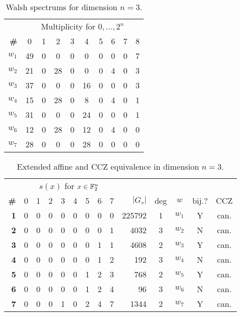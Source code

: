 \begin{table}[h]\centering
\begin{tabular}{>{\bfseries}rccccccccc}
\toprule
& \multicolumn{9}{c}{Multiplicity for $0, ..., 2^n$} \\
\cmidrule{2-10}
\# & 0 & 1 & 2 & 3 & 4 & 5 & 6 & 7 & 8 \\
\midrule
$w_1$ & 49 & 0 & 0 & 0 & 0 & 0 & 0 & 0 & 7 \\
$w_2$ & 21 & 0 & 28 & 0 & 0 & 0 & 4 & 0 & 3 \\
$w_3$ & 37 & 0 & 0 & 0 & 16 & 0 & 0 & 0 & 3 \\
$w_4$ & 15 & 0 & 28 & 0 & 8 & 0 & 4 & 0 & 1 \\
$w_5$ & 31 & 0 & 0 & 0 & 24 & 0 & 0 & 0 & 1 \\
$w_6$ & 12 & 0 & 28 & 0 & 12 & 0 & 4 & 0 & 0 \\
$w_7$ & 28 & 0 & 0 & 0 & 28 & 0 & 0 & 0 & 0 \\
\bottomrule
\end{tabular}
\caption{Walsh spectrums for dimension $n=3$.}
\label{tab:walshdim3}
\end{table}

\begin{table}[h]\centering
\begin{tabular}{>{\bfseries}rccccccccrcccc}
\toprule
& \multicolumn{8}{c}{$s(x)$ for $x\in{\mathbb{F}}_2^n$} \\
\cmidrule{2-9}
\# & 0 & 1 & 2 & 3 & 4 & 5 & 6 & 7 & $|G_s|$ & deg & $w$ & bij.? & CCZ \\
\midrule
1 & 0 & 0 & 0 & 0 & 0 & 0 & 0 & 0 & 225792 & 1 & $w_1$ & Y & can. \\
2 & 0 & 0 & 0 & 0 & 0 & 0 & 0 & 1 & 4032 & 3 & $w_2$ & N & can. \\
3 & 0 & 0 & 0 & 0 & 0 & 0 & 1 & 1 & 4608 & 2 & $w_3$ & Y & can. \\
4 & 0 & 0 & 0 & 0 & 0 & 0 & 1 & 2 & 192 & 3 & $w_4$ & N & can. \\
5 & 0 & 0 & 0 & 0 & 0 & 1 & 2 & 3 & 768 & 2 & $w_5$ & Y & can. \\
6 & 0 & 0 & 0 & 0 & 0 & 1 & 2 & 4 & 96 & 3 & $w_6$ & N & can. \\
7 & 0 & 0 & 0 & 1 & 0 & 2 & 4 & 7 & 1344 & 2 & $w_7$ & Y & can. \\
 \bottomrule
\end{tabular}
\caption{Extended affine and CCZ equivalence in dimension $n=3$.}
\label{tab:dim3}
\end{table}
